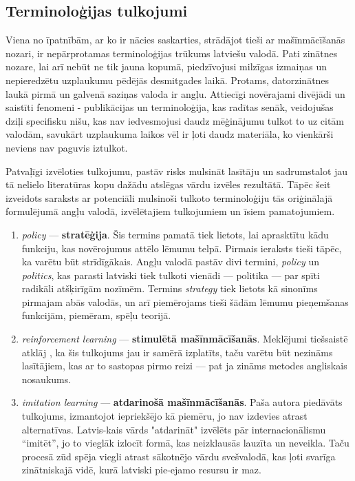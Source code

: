 \documentclass[12pt, a4paper]{article}
\numberwithin{equation}{section} %
\begin{document}
\subsection{Terminoloģijas tulkojumi}

Viena no īpatnībām, ar ko ir nācies saskarties, strādājot tieši ar mašīnmācīšanās nozari, ir nepārprotamas terminoloģijas trūkums latviešu valodā. Pati zinātnes nozare, lai arī nebūt ne tik jauna kopumā, piedzīvojusi milzīgas izmaiņas un nepieredzētu uzplaukumu pēdējās desmitgades laikā. Protams, datorzinātnes laukā pirmā un galvenā saziņas valoda ir angļu. Attiecīgi novērajami divējādi un saistīti fenomeni - publikācijas un terminoloģija, kas radītas senāk, veidojušas dziļi specifisku nišu, kas nav iedvesmojusi daudz mēģinājumu tulkot to uz citām valodām, savukārt uzplaukuma laikos vēl ir ļoti daudz materiāla, ko vienkārši neviens nav paguvis iztulkot.

Patvaļīgi izvēloties tulkojumu, pastāv risks mulsināt lasītāju un sadrumstalot jau tā nelielo literatūras kopu dažādu atslēgas vārdu izvēles rezultātā. Tāpēc šeit izveidots saraksts ar potenciāli mulsinoši tulkoto terminoloģiju tās oriģinālajā formulējumā angļu valodā, izvēlētajiem tulkojumiem un īsiem pamatojumiem.  

\begin{enumerate}
    \item \textit{policy} --- \textbf{stratēģija}. Šis termins pamatā tiek lietots, lai aprasktītu kādu funkciju, kas novērojumus attēlo lēmumu telpā. Pirmais ieraksts tieši tāpēc, ka varētu būt strīdīgākais. Angļu valodā pastāv divi termini, \textit{policy} un \textit{politics}, kas parasti latviski tiek tulkoti vienādi --- politika --- par spīti radikāli atšķirīgām nozīmēm. Termins \textit{strategy} tiek lietots kā sinonīms pirmajam abās valodās, un arī piemērojams tieši šādām lēmumu pieņemšanas funkcijām, piemēram, spēļu teorijā.
    \item \textit{reinforcement learning} --- \textbf{stimulētā mašīnmācīšanās}. Meklējumi tiešsaistē atklāj \cite{enc_stim}, ka šis tulkojums jau ir samērā izplatīts, taču varētu būt nezināms lasītājiem, kas ar to sastopas pirmo reizi --- pat ja zināms metodes angliskais nosaukums.
    \item \textit{imitation learning} --- \textbf{atdarinošā mašīnmācīšanās}. Paša autora piedāvāts tulkojums, izmantojot iepriekšējo kā piemēru, jo nav izdevies atrast alternatīvas. Latvis-kais vārds "atdarināt" izvēlēts pār internacionālismu ``imitēt'', jo to vieglāk izlocīt formā, kas neizklausās lauzīta un neveikla. Taču procesā zūd spēja viegli atrast sākotnējo vārdu svešvalodā, kas ļoti svarīga zinātniskajā vidē, kurā latviski pie-ejamo resursu ir maz.
\end{enumerate}
\end{document}
